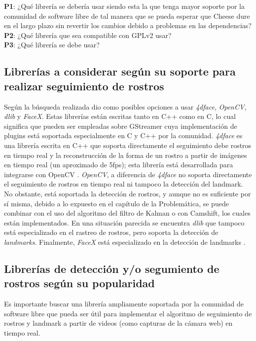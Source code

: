 \documentclass[a4paper,openright,12pt]{report}
\begin{document}
\noindent
\textbf{P1}: ¿Qué librería se debería usar siendo esta la que tenga mayor soporte
por la comunidad de software libre de tal manera que se pueda esperar que
Cheese dure en el largo plazo sin revertir los cambios debido a problemas en
las dependencias?\\
\textbf{P2}: ¿Qué librería que sea compatible con GPLv2 usar?\\
\textbf{P3}: ¿Qué librería se debe usar?

\subsection{Librerías a considerar según su soporte para realizar seguimiento
						de rostros}
Según la búsqueda realizada dio como posibles opciones a usar \textit{4dface},
\textit{OpenCV}, \textit{dlib} y \textit{FaceX}. Estas librerías están escritas
tanto en C++ como en C, lo cual significa que pueden ser empleadas sobre
GStreamer cuya implementación de plugins está soportada especialmente en C y C++
por la comunidad.
\textit{4dface} es una librería escrita en C++ que soporta directamente el
seguimiento debe rostros en tiempo real y la reconstrucción de la forma de un
rostro a partir de imágenes en tiempo real (un aproximado de 5fps); esta librería
está desarrollada para integrarse con OpenCV \cite{4dface}. \textit{OpenCV}, a
diferencia de \textit{4dface} no soporta directamente el seguimiento de rostros
en tiempo real ni tampoco la detección del landmark. No obstante, está soportada
la detección de rostros, y aunque no es suficiente por sí misma, debido a lo
expuesto en el capítulo de la Problemática, se puede combinar con el uso del
algoritmo del filtro de Kalman o con Camshift, los cuales están implementados.
En una situación parecida se encuentra \textit{dlib} que tampoco está
especializado en el rastreo de rostros, pero soporta la detección de
\textit{landmarks}. Finalmente, \textit{FaceX} está especializado en la
detección de landmarks \cite{FaceX}.

\subsection{Librerías de detección y/o segumiento de rostros según su
            popularidad}
Es importante buscar una librería ampliamente soportada por la comunidad de
software libre que pueda ser útil para implementar el algoritmo de seguimiento
de rostros y landmark a partir de videos (como capturas de la cámara web) en
tiempo real.
\end{document}

